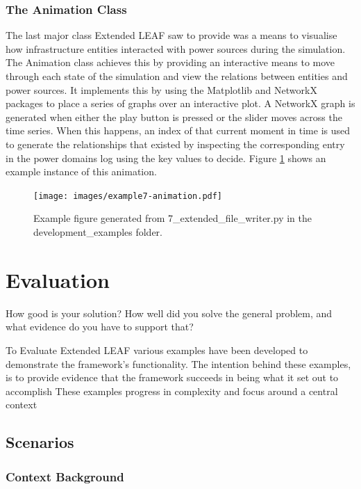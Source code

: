 \documentclass{l4proj}
\begin{document}
\subsection{The Animation Class}\label{subsec:imp:animation}
The last major class Extended LEAF saw to provide was a means to visualise how infrastructure entities interacted with power sources during the simulation.
The Animation class achieves this by providing an interactive means to move through each state of the simulation and view the relations between entities and power sources.
It implements this by using the Matplotlib and NetworkX packages to place a series of graphs over an interactive plot.
A NetworkX graph is generated when either the play button is pressed or the slider moves across the time series.
When this happens, an index of that current moment in time is used to generate the relationships that existed by inspecting the corresponding entry in the power domains log using the key values to decide.
Figure \ref{fig:dev-example7-animation} shows an example instance of this animation.
\begin{figure}[h]
    \centering
    \texttt{[image: images/example7-animation.pdf]}
    ~
    \caption{Example figure generated from 7\_extended\_file\_writer.py in the development\_examples folder.}
    \label{fig:dev-example7-animation}
\end{figure}



\chapter{Evaluation} \label{chp:evaluation}
How good is your solution? How well did you solve the general problem, and what evidence do you have to support that?

To Evaluate Extended LEAF various examples have been developed to demonstrate the framework's functionality.
The intention behind these examples, is to provide evidence that the framework succeeds in being what it set out to accomplish
These examples progress in complexity and focus around a central context
\section{Scenarios}\label{eval:sec:scenarios}
\subsection{Context Background}\label{eval:subsec:precision-agriculture}
\end{document}
